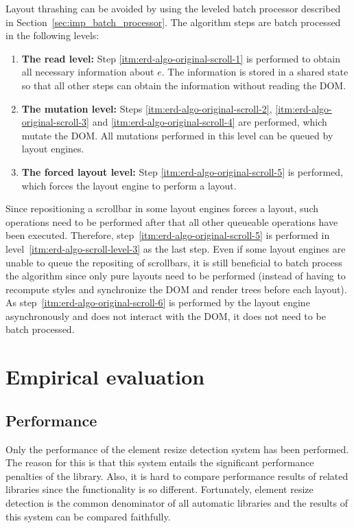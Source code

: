 \documentclass{acm_proc_article-sp}
\newcommand{\gls}[1]{#1}
\begin{document}
    Layout thrashing can be avoided by using the leveled batch processor described in Section~\ref{sec:imp_batch_processor}.
    The algorithm steps are batch processed in the following levels:
    \begin{enumerate}
      \item\label{itm:erd-algo-scroll-level-1}
        \textbf{The read level:}
        Step \ref{itm:erd-algo-original-scroll-1} is performed to obtain all necessary information about $e$.
        The information is stored in a shared state so that all other steps can obtain the information without reading the \gls{DOM}.
      \item\label{itm:erd-algo-scroll-level-2}
        \textbf{The mutation level:}
        Steps \ref{itm:erd-algo-original-scroll-2}, \ref{itm:erd-algo-original-scroll-3} and \ref{itm:erd-algo-original-scroll-4} are performed, which mutate the \gls{DOM}.
        All mutations performed in this level can be queued by layout engines.
      \item\label{itm:erd-algo-scroll-level-3}
        \textbf{The forced layout level:}
        Step \ref{itm:erd-algo-original-scroll-5} is performed, which forces the \gls{layout engine} to perform a layout.
    \end{enumerate}

    Since repositioning a scrollbar in some layout engines forces a layout, such operations need to be performed after that all other queueable operations have been executed.
    Therefore, step~\ref{itm:erd-algo-original-scroll-5} is performed in level~\ref{itm:erd-algo-scroll-level-3} as the last step.
    Even if some layout engines are unable to queue the repositing of scrollbars, it is still beneficial to batch process the algorithm since only pure layouts need to be performed (instead of having to recompute styles and synchronize the \gls{DOM} and render trees before each layout).
    As step~\ref{itm:erd-algo-original-scroll-6} is performed by the \gls{layout engine} asynchronously and does not interact with the \gls{DOM}, it does not need to be batch processed.

\section{Empirical evaluation}\label{sec:eval}
  \subsection{Performance}\label{sec:eval-perf}
    Only the performance of the element resize detection system has been performed.
    The reason for this is that this system entails the significant performance penalties of the library.
    Also, it is hard to compare performance results of related libraries since the functionality is so different.
    Fortunately, element resize detection is the common denominator of all automatic libraries and the results of this system can be compared faithfully.
\end{document}
